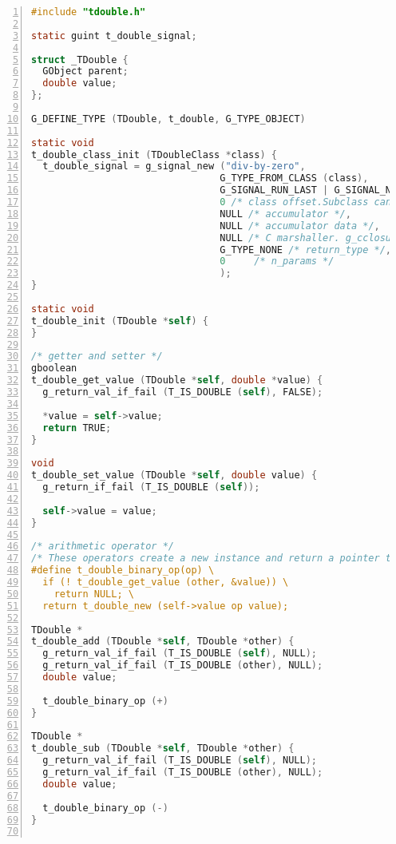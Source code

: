 \begin{lstlisting}[language=C, numbers=left]
#include "tdouble.h"

static guint t_double_signal;

struct _TDouble {
  GObject parent;
  double value;
};

G_DEFINE_TYPE (TDouble, t_double, G_TYPE_OBJECT)

static void
t_double_class_init (TDoubleClass *class) {
  t_double_signal = g_signal_new ("div-by-zero",
                                 G_TYPE_FROM_CLASS (class),
                                 G_SIGNAL_RUN_LAST | G_SIGNAL_NO_RECURSE | G_SIGNAL_NO_HOOKS,
                                 0 /* class offset.Subclass cannot override the class handler (default handler). */,
                                 NULL /* accumulator */,
                                 NULL /* accumulator data */,
                                 NULL /* C marshaller. g_cclosure_marshal_generic() will be used */,
                                 G_TYPE_NONE /* return_type */,
                                 0     /* n_params */
                                 );
}

static void
t_double_init (TDouble *self) {
}

/* getter and setter */
gboolean
t_double_get_value (TDouble *self, double *value) {
  g_return_val_if_fail (T_IS_DOUBLE (self), FALSE);

  *value = self->value;
  return TRUE;
}

void
t_double_set_value (TDouble *self, double value) {
  g_return_if_fail (T_IS_DOUBLE (self));

  self->value = value;
}

/* arithmetic operator */
/* These operators create a new instance and return a pointer to it. */
#define t_double_binary_op(op) \
  if (! t_double_get_value (other, &value)) \
    return NULL; \
  return t_double_new (self->value op value);

TDouble *
t_double_add (TDouble *self, TDouble *other) {
  g_return_val_if_fail (T_IS_DOUBLE (self), NULL);
  g_return_val_if_fail (T_IS_DOUBLE (other), NULL);
  double value;

  t_double_binary_op (+)
}

TDouble *
t_double_sub (TDouble *self, TDouble *other) {
  g_return_val_if_fail (T_IS_DOUBLE (self), NULL);
  g_return_val_if_fail (T_IS_DOUBLE (other), NULL);
  double value;

  t_double_binary_op (-)
}


\end{lstlisting}
